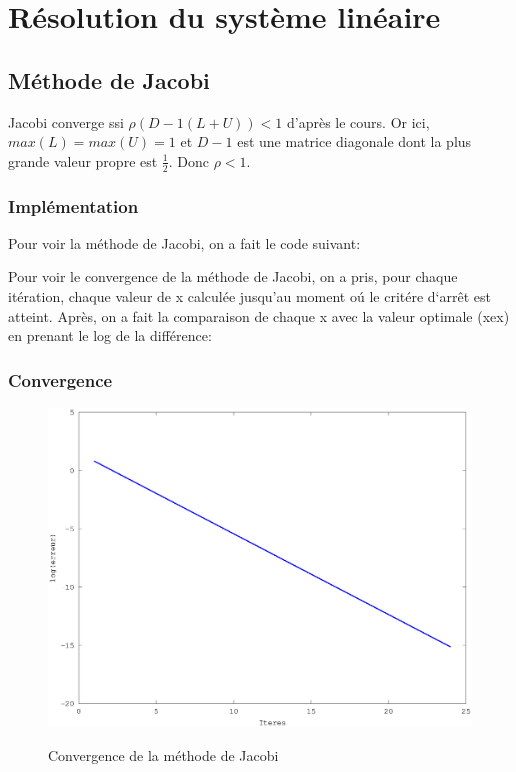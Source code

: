 \documentclass[a4paper,11pt]{article}
\begin{document}
\titleTMB 
\newpage
\tableofcontents
\listoffigures
\newpage

\section{Résolution du système linéaire}

\subsection{Méthode de Jacobi}
Jacobi converge ssi $\rho(D-1(L+U)) < 1$ d'après le cours.
Or ici, $max (L) = max (U) = 1$ et $D-1$ est une matrice diagonale dont la plus grande valeur propre est $\frac{1}{2}$.
Donc $\rho < 1$.

\subsubsection{Implémentation}

Pour voir la méthode de Jacobi, on a fait le code suivant:

\begin{multicols}{2}
  
\end{multicols}

\newpage

Pour  voir le  convergence  de la  méthode de  Jacobi,  on a  pris, pour  chaque
itération, chaque valeur de x
calculée jusqu'au moment oú le critére d`arrêt est atteint. Après, on a fait la comparaison de
chaque x avec la valeur optimale (xex) en prenant le log de la différence:

\subsubsection{Convergence}
\begin{figure}[h!]
  \begin{centering}
    \includegraphics[scale=0.5]{../jacobi_graph}
    \label{rspro2}
    \par\end{centering}
  \caption{Convergence de la méthode de Jacobi}
  \label{fig:jacobi-conv}
\end{figure}
\end{document}

